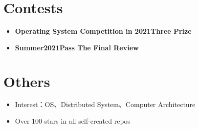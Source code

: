 \documentclass{cv}
\begin{document}
\section{Contests}
\begin{itemize}
  \item \textbf{Operating System Competition in 2021}\quad \textbf{Three Prize}
  \item \textbf{Summer2021}\quad \textbf{Pass The Final Review}
\end{itemize}

\section{Others}
\begin{itemize}
  \item Interest：OS、Distributed System、Computer Architecture
  \item Over 100 stars in all self-created repos
\end{itemize}
\end{document}
